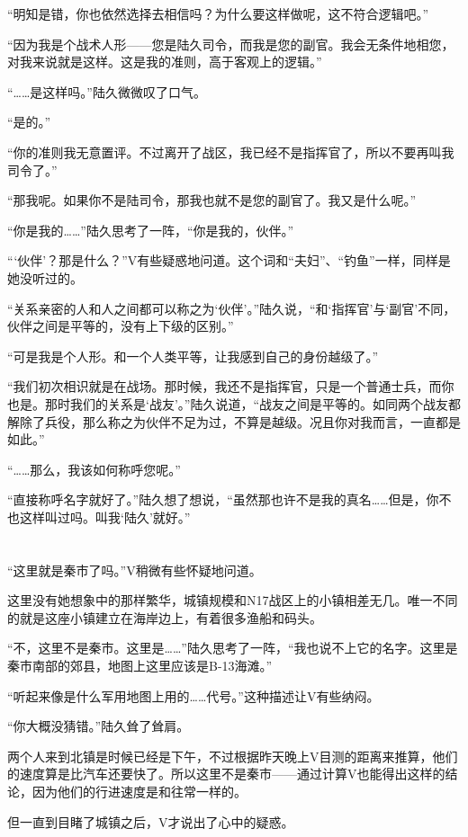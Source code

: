“明知是错，你也依然选择去相信吗？为什么要这样做呢，这不符合逻辑吧。”

“因为我是个战术人形——您是陆久司令，而我是您的副官。我会无条件地相您，对我来说就是这样。这是我的准则，高于客观上的逻辑。”

“……是这样吗。”陆久微微叹了口气。

“是的。”

“你的准则我无意置评。不过离开了战区，我已经不是指挥官了，所以不要再叫我司令了。”

“那我呢。如果你不是陆司令，那我也就不是您的副官了。我又是什么呢。”

“你是我的……”陆久思考了一阵，“你是我的，伙伴。”

“‘伙伴’？那是什么？”V有些疑惑地问道。这个词和“夫妇”、“钓鱼”一样，同样是她没听过的。

“关系亲密的人和人之间都可以称之为‘伙伴’。”陆久说，“和‘指挥官’与‘副官’不同，伙伴之间是平等的，没有上下级的区别。”

“可是我是个人形。和一个人类平等，让我感到自己的身份越级了。”

“我们初次相识就是在战场。那时候，我还不是指挥官，只是一个普通士兵，而你也是。那时我们的关系是‘战友’。”陆久说道，“战友之间是平等的。如同两个战友都解除了兵役，那么称之为伙伴不足为过，不算是越级。况且你对我而言，一直都是如此。”

“……那么，我该如何称呼您呢。”

“直接称呼名字就好了。”陆久想了想说，“虽然那也许不是我的真名……但是，你不也这样叫过吗。叫我‘陆久’就好。”

\section*{}

“这里就是秦市了吗。”V稍微有些怀疑地问道。

这里没有她想象中的那样繁华，城镇规模和N17战区上的小镇相差无几。唯一不同的就是这座小镇建立在海岸边上，有着很多渔船和码头。

“不，这里不是秦市。这里是……”陆久思考了一阵，“我也说不上它的名字。这里是秦市南部的郊县，地图上这里应该是B-13海滩。”

“听起来像是什么军用地图上用的……代号。”这种描述让V有些纳闷。

“你大概没猜错。”陆久耸了耸肩。

两个人来到北镇是时候已经是下午，不过根据昨天晚上V目测的距离来推算，他们的速度算是比汽车还要快了。所以这里不是秦市——通过计算V也能得出这样的结论，因为他们的行进速度是和往常一样的。

但一直到目睹了城镇之后，V才说出了心中的疑惑。

